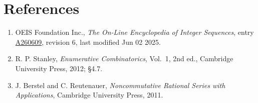 \documentclass[11pt]{article}
\theoremstyle{definition}
\begin{document}
\section{References}

\begin{enumerate}

\item OEIS Foundation Inc., \emph{The On-Line Encyclopedia of Integer Sequences}, entry \href{https://oeis.org/A260609}{A260609}, revision 6, last modified Jun 02 2025.

\item R. P. Stanley, \emph{Enumerative Combinatorics}, Vol.~1, 2nd ed., Cambridge University Press, 2012; \S4.7.

\item J. Berstel and C. Reutenauer, \emph{Noncommutative Rational Series with Applications}, Cambridge University Press, 2011.

\end{enumerate}
\end{document}
